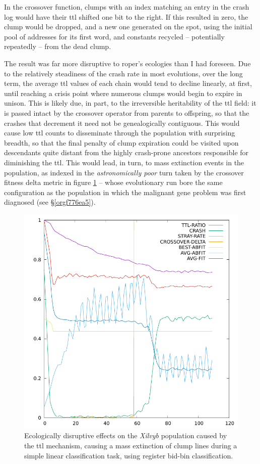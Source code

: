 \documentclass[12pt,glossary]{dalthesis}
\begin{document}
In the crossover function, clumps with an index matching an entry in the crash log
would have their \gls{ttl} shifted one bit to the right. If this resulted in zero, the
clump would be dropped, and a new one generated on the spot, using the initial pool
of addresses for its first word, and constants recycled -- potentially repeatedly -- from
the dead clump. 

The result was far more disruptive to \gls{roper}'s ecologies than I had foreseen. 
Due to the relatively steadiness of the crash rate in most evolutions, over the
long term, the average \gls{ttl} values of each chain would tend to decline 
linearly, at first, until reaching a crisis point where numerous clumps would begin
to expire in unison. 
This is likely due, in part, to the irreversible heritability
of the \gls{ttl} field: it is passed intact by the crossover operator from parents to 
offspring, so that the crashes that decrement it need not be genealogically
contiguous. This would cause low \gls{ttl} counts to disseminate through the
population with surprising breadth, so that the final penalty of clump expiration
could be visited upon descendants quite distant from the highly crash-prone
ancestors responsible for diminishing the \gls{ttl}. 
This would lead, in turn, to mass extinction events in the population, as indexed in
the \emph{astronomically poor} turn taken by the crossover fitness delta metric in 
figure \ref{fig:orgafe3202} -- whose evolutionary run bore the same configuration as the population
in which the malignant gene problem was first diagnosed (see \S \ref{orgf776ea5}).  

\begin{figure}[htbp]
\centering
\includegraphics[width=.9\linewidth]{../images/plots/xilvyb.pdf}
\caption{\label{fig:orgafe3202}
Ecologically disruptive effects on the \emph{Xilvyb} population caused by the \gls{ttl} mechanism, causing a mass extinction of clump lines during a simple linear classification task, using register bid-bin classification.}
\end{figure}
\end{document}
